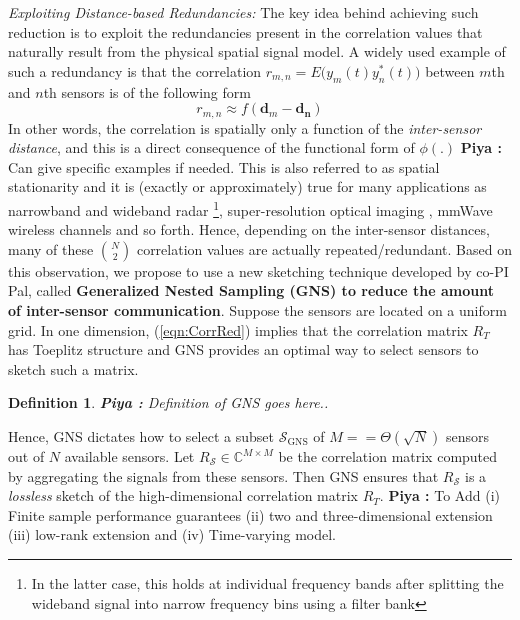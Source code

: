 \documentclass{article}
\newtheorem{definition}{Definition}
\newcommand{\comment}[3]{{\color{#1} {\bf #2 :} #3}}
\newcommand{\piya}[1]{\comment{blue}{Piya}{#1}}
\begin{document}
\begin{itemize}
\begin{enumerate}
{\em Exploiting Distance-based Redundancies:} The key idea behind achieving such reduction is to exploit the redundancies present in the correlation values that naturally result from the physical spatial signal model. A widely used example of such a redundancy is that the correlation $r_{m,n} = E\Big(y_m(t)y^*_n(t)\Big)$ between $m$th and $n$th sensors is of the following form \begin{equation} r_{m,n} \approx f(\mathbf{d}_m - \mathbf{d_n}) \label{eqn:CorrRed}\end{equation}
In other words, the correlation is spatially only a function of the {\em inter-sensor distance}, and this is a direct consequence of the functional form of $\phi(.)$ \piya{Can give specific examples if needed}. This is also referred to as spatial stationarity and it is (exactly or approximately) true for many applications as narrowband and wideband radar \footnote{In the latter case, this holds at individual frequency bands after splitting the wideband signal into narrow frequency bins using a filter bank}, super-resolution optical imaging \cite{}, mmWave wireless channels \cite{} and so forth. Hence, depending on the inter-sensor distances, many of these $N\choose 2$ correlation values are actually repeated/redundant. Based on this observation, we propose to use a new sketching technique developed by co-PI Pal, called {\bf Generalized Nested Sampling (GNS) to reduce the amount of inter-sensor communication}. Suppose the sensors are located on a uniform grid. In one dimension, (\ref{eqn:CorrRed}) implies that the correlation matrix $R_T$ has Toeplitz structure and GNS provides an optimal way to select sensors to sketch such a matrix. 
\begin{definition}\piya{Definition of GNS goes here..}
\end{definition}
Hence, GNS dictates how to select a subset $\mathcal{S}_{\text{GNS}}$ of $M =  = \Theta(\sqrt{N})$ sensors out of $N$ available sensors. Let $R_{\mathcal{S}} \in \mathbb{C}^{M\times M}$ be the correlation matrix computed by aggregating the signals from these sensors. Then GNS ensures that $R_{\mathcal{S}}$ is a {\em lossless} sketch of the high-dimensional correlation matrix $R_T$. \piya{To Add (i) Finite sample performance guarantees (ii) two and three-dimensional extension (iii) low-rank extension and (iv) Time-varying model.}



\end{enumerate}
\end{itemize}
\end{document}
